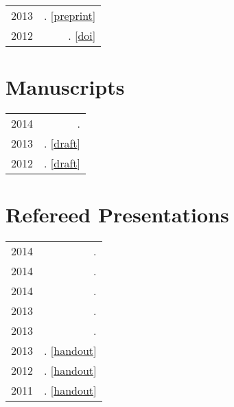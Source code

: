 \documentclass[letterpaper]{article}
\makeatletter
\newcommand{\myvrule}{\color{lightgray}\vrule width 1.0pt}
\newenvironment{cvsection}{%
  \renewcommand{\arraystretch}{1.75}
  \begin{longtable}[l]{@{} L R @{}}
}{%
  \end{longtable}
}
\makeatother
\begin{document}
\begin{cvsection}
  2013 & \null{}.
  [\href{http://people.linguistics.mcgill.ca/~brian.buccola/files/buccola2013-fg.pdf}{preprint}] \\

  2012 & \null{}.
  [\href{http://dx.doi.org/10.3765/sp}{doi}] \\
\end{cvsection}



\section*{Manuscripts}

\begin{cvsection}
  2014 & \null{}. \\

  2013 & \null{}.
  [\href{http://people.linguistics.mcgill.ca/~brian.buccola/files/buccola2013-eval2.pdf}{draft}] \\

  2012 & \null{}.
  [\href{http://people.linguistics.mcgill.ca/~brian.buccola/files/buccola2012-eval1.pdf}{draft}] \\
\end{cvsection}



\section*{Refereed Presentations}

\begin{cvsection}
  2014 & \null{}. \\
  2014 & \null{}. \\
  2014 & \null{}. \\
  2013 & \null{}. \\
  2013 & \null{}. \\
  2013 & \null{}.
  [\href{http://people.linguistics.mcgill.ca/~brian.buccola/files/buccola2013-mot.pdf}{handout}] \\

  2012 & \null{}.
  [\href{http://people.linguistics.mcgill.ca/~brian.buccola/files/buccola2012-tom5.pdf}{handout}] \\

  2011 & \null{}.
  [\href{http://people.linguistics.mcgill.ca/~brian.buccola/files/buccola2011-tom4.pdf}{handout}] \\
\end{cvsection}
\end{document}

